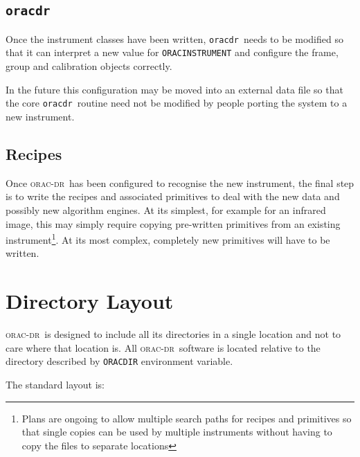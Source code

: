 \documentclass[twoside,11pt]{article}
\renewcommand{\_}{\texttt{\symbol{95}}}
\newcommand{\Oracdr}{\textsc{orac-dr}}
\newcommand{\oracdr}{\texttt{oracdr}}
\begin{document}
\subsection{\oracdr}

Once the instrument classes have been written, \oracdr\ needs to be
modified so that it can interpret a new value for
\texttt{ORAC\_INSTRUMENT} and configure the frame, group and
calibration objects correctly.

In the future this configuration may be moved into an external data
file so that the core \oracdr\ routine need not be modified by people
porting the system to a new instrument.

\subsection{Recipes}

Once \Oracdr\ has been configured to recognise the new instrument, the 
final step is to write the recipes and associated primitives to deal
with the new data and possibly new algorithm engines. At its simplest, 
for example for an infrared image, this may simply require copying
pre-written primitives from an existing instrument\footnote{Plans are
ongoing to allow multiple search paths for recipes and primitives so
that single copies can be used by multiple instruments without having
to copy the files to separate locations}.
At its most complex, completely new primitives will have to be written.

\appendix

\section{Directory Layout}

\Oracdr\ is designed to include all its directories in a single
location and not to care where that location is. All \Oracdr\ software
is located relative to the directory described by  \texttt{ORAC\_DIR}
environment variable.

The standard layout is:
\end{document}
